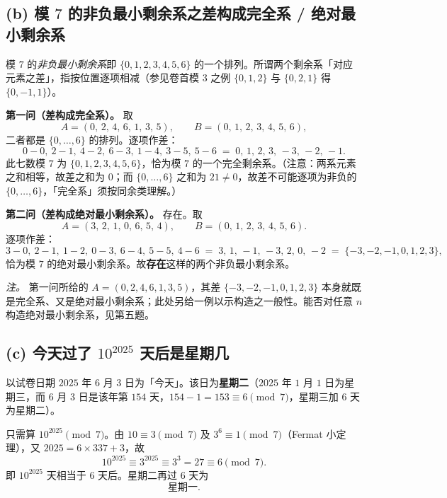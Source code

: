 \documentclass{article}
\begin{document}
\subsection*{(b) 模 $7$ 的非负最小剩余系之差构成完全系 / 绝对最小剩余系}

模 $7$ 的\emph{非负最小剩余系}即 $\{0,1,2,3,4,5,6\}$ 的一个排列。所谓两个剩余系「对应元素之差」，指按位置逐项相减（参见卷首模 $3$ 之例 $\{0,1,2\}$ 与 $\{0,2,1\}$ 得 $\{0,-1,1\}$）。

\begin{solution}
\textbf{第一问（差构成完全系）。} 取
\[
  A=(0,\,2,\,4,\,6,\,1,\,3,\,5),\qquad B=(0,\,1,\,2,\,3,\,4,\,5,\,6),
\]
二者都是 $\{0,\dots,6\}$ 的排列。逐项作差：
\[
  0-0,\ 2-1,\ 4-2,\ 6-3,\ 1-4,\ 3-5,\ 5-6
  \;=\;0,\,1,\,2,\,3,\,-3,\,-2,\,-1.
\]
此七数模 $7$ 为 $\{0,1,2,3,4,5,6\}$，恰为模 $7$ 的一个完全剩余系。（注意：两系元素之和相等，故差之和为 $0$；而 $\{0,\dots,6\}$ 之和为 $21\ne0$，故差不可能逐项为非负的 $\{0,\dots,6\}$，「完全系」须按同余类理解。）

\medskip
\textbf{第二问（差构成绝对最小剩余系）。} 存在。取
\[
  A=(3,\,2,\,1,\,0,\,6,\,5,\,4),\qquad B=(0,\,1,\,2,\,3,\,4,\,5,\,6).
\]
逐项作差：
\[
  3-0,\ 2-1,\ 1-2,\ 0-3,\ 6-4,\ 5-5,\ 4-6
  \;=\;3,\,1,\,-1,\,-3,\,2,\,0,\,-2
  \;=\;\{-3,-2,-1,0,1,2,3\},
\]
恰为模 $7$ 的绝对最小剩余系。故\textbf{存在}这样的两个非负最小剩余系。

\medskip
\noindent\textit{注。} 第一问所给的 $A=(0,2,4,6,1,3,5)$，其差 $\{-3,-2,-1,0,1,2,3\}$ 本身就既是完全系、又是绝对最小剩余系；此处另给一例以示构造之一般性。能否对任意 $n$ 构造绝对最小剩余系，见第五题。
\end{solution}

\subsection*{(c) 今天过了 $10^{2025}$ 天后是星期几}

\begin{solution}
以试卷日期 $2025$ 年 $6$ 月 $3$ 日为「今天」。该日为\textbf{星期二}（$2025$ 年 $1$ 月 $1$ 日为星期三，而 $6$ 月 $3$ 日是该年第 $154$ 天，$154-1=153\equiv 6\pmod 7$，星期三加 $6$ 天为星期二）。

只需算 $10^{2025}\pmod 7$。由 $10\equiv 3\pmod 7$ 及 $3^{6}\equiv 1\pmod 7$（Fermat 小定理），又 $2025=6\times 337+3$，故
\[
  10^{2025}\equiv 3^{2025}\equiv 3^{3}=27\equiv 6\pmod 7.
\]
即 $10^{2025}$ 天相当于 $6$ 天后。星期二再过 $6$ 天为
\[
  \boxed{\text{星期一}.}
\]
\end{solution}
\end{document}
